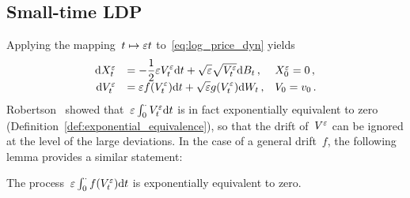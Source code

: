 \subsection{Small-time LDP}\label{sec:SmallTimeLDP}
Applying the mapping~$t\mapsto \varepsilon t$ to~\eqref{eq:log_price_dyn} yields
\begin{equation}\label{eq:log_price_dynSmallTime}
\begin{array}{rll}
\mathrm{d} X_t^\varepsilon & = \displaystyle  -\frac{1}{2}\varepsilon V_t^\varepsilon \mathrm{d} t + \sqrt{\varepsilon}\sqrt{V_t^\varepsilon} \mathrm{d} B_t\,,
 & X_0^\varepsilon = 0\,,\\
\mathrm{d} V_t^\varepsilon & = \displaystyle \varepsilon f(V_t^\varepsilon)\mathrm{d} t + \sqrt{\varepsilon}g(V_t^\varepsilon) \mathrm{d} W_t\,, & V_0 = v_0\,.
\end{array}
\end{equation}
Robertson~\cite[Proposition~3.2]{Robertson2010SampleModels} showed that~$\varepsilon\int_0^\cdot V_t^\varepsilon \mathrm{d} t$ is in fact exponentially equivalent to zero (Definition~\ref{def:exponential_equivalence}),
so that the drift of~$V^\varepsilon$ can be ignored at the level of the large deviations. 
In the case of a general drift~$f$, the following lemma provides a similar statement:
\begin{lemma}
The process~$\varepsilon\int_0^\cdot f(V_t^\varepsilon) \mathrm{d} t$ is exponentially equivalent to zero.
\end{lemma}
